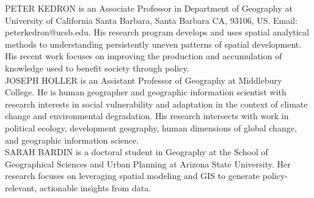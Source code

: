 \documentclass[]{interact}
\theoremstyle{plain}%
\theoremstyle{definition}
\theoremstyle{remark}
\begin{document}
\newpage
\noindent PETER KEDRON is an Associate Professor in Department of Geography at University of California Santa Barbara, Santa Barbara CA, 93106, US. Email: peterkedron@ucsb.edu. His research program develops and uses spatial analytical methods to understanding persistently uneven patterns of spatial development. His recent work focuses on improving the production and accumulation of knowledge used to benefit society through policy. \\  
  
\noindent JOSEPH HOLLER is an Assistant Professor of Geography at Middlebury College. He is human geographer and geographic information scientist with research interests in social vulnerability and adaptation in the context of climate change and environmental degradation. His research intersects with work in political ecology, development geography, human dimensions of global change, and geographic information science. \\
  
\noindent SARAH BARDIN is a doctoral student in Geography at the School of Geographical Sciences and Urban Planning at Arizona State University. Her research focuses on leveraging spatial modeling and GIS to generate policy-relevant, actionable insights from data.
\end{document}

